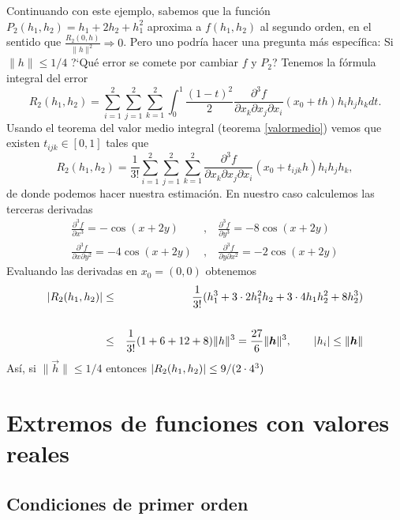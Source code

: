 Continuando con este ejemplo, sabemos que  la funci\'on
$P_2(h_1,h_2)=h_1+2h_2+h_1^2 $ aproxima a $ f(h_1,h_2) $ al
segundo orden, en el sentido que $\frac{R_2(0,h)}{\|h\|^2}
\Rightarrow 0 $. Pero uno podr\'ia hacer una pregunta m\'as espec\'ifica:
Si $ \|h\|\leq1/4 $ ?`Qu\'e error se comete por cambiar $ f $ y $
P_2$?
Tenemos la f\'ormula integral del error
\[ R_2(h_1,h_2)=\sum_{i=1}^2 \sum_{j=1}^2 \sum_{k=1}^2 \int_{0}^1
\frac{(1-t)^2}{2} \frac{\partial^3 f}{\partial x_k \partial x_j
\partial x_i}(x_0+th)h_ih_jh_kdt. \]
Usando el teorema del valor medio integral (teorema \ref{valormedio}) vemos que existen 
$ t_{ijk} \in [0,1] $ tales que
\[R_2(h_1,h_2)=\frac{1}{3!}\sum_{i=1}^2 \sum_{j=1}^2 \sum_{k=1}^2 \frac{\partial^3
f}{\partial x_k \partial x_j
\partial x_i}(x_0+t_{ijk}h)h_ih_jh_k, \]
de donde podemos hacer nuestra estimaci\'on.
En nuestro caso calculemos las terceras derivadas
\begin{eqnarray}
\frac{\partial^3 f}{\partial x^3}=-\cos(x+2y) &\:,\:& \frac{\partial^3 f}{\partial y^3}=-8\cos(x+2y) \nonumber \\
\frac{\partial^3 f}{\partial x \partial y^2 }=-4\cos(x+2y) &\:,\:& \frac{\partial^3 f}{\partial y \partial x^2 }=-2\cos(x+2y) \nonumber
\end{eqnarray}
Evaluando las derivadas en $x_0=(0,0)$ obtenemos
\begin{eqnarray*} \left\lvert R_2(h_1,h_2)\right\rvert &\leq & \frac{1}{3!}(h_1^3+3\cdot
2h_1^2h_2+3\cdot4h_1h_2^2+8h_2^3) \\
\\ & \leq & \frac{1}{3!}(1+6+12+8)\|h\|^3=\frac{27}{6}\|\boldsymbol{h}\|^3, \qquad \left\lvert h_i\right\rvert\leq
\|\boldsymbol{h}\| \\
\end{eqnarray*}
As\'i, si $\|\vec{h}\|\le 1/4$ entonces $\left\lvert R_2(h_1,h_2)\right\rvert\le 9/(2\cdot 4^3)$

\section{Extremos de funciones con valores reales}

\subsection{Condiciones de primer orden}

